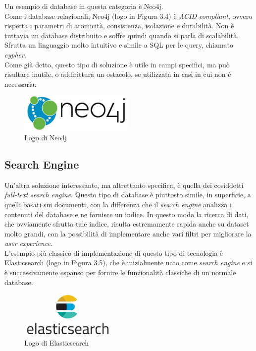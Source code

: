\noindent Un esempio di database in questa categoria è Neo4j\cite{site:udemyneo4j}.\\
Come i database relazionali, Neo4j (logo in Figura 3.4) è \textit{ACID compliant}, ovvero rispetta i parametri di atomicità, consistenza, isolazione e durabilità. Non è tuttavia un \gls{database distribuito} e soffre quindi quando si parla di scalabilità.\\
Sfrutta un linguaggio molto intuitivo e simile a \gls{SQL} per le query, chiamato \textit{cypher}.\\

\noindent Come già detto, questo tipo di soluzione è utile in campi specifici, ma può risultare inutile, o addirittura un ostacolo, se utilizzata in casi in cui non è necessaria.

\begin{figure}[htbp]
\begin{center}
\includegraphics[height=5em]{immagini/tecnologies-logos/neo4j-logo.png}
\caption{Logo di Neo4j}
\end{center}
\end{figure}

\subsection{Search Engine}
Un'altra soluzione interessante, ma altrettanto specifica, è quella dei cosiddetti \textit{full-text search engine}. Questo tipo di database è piuttosto simile, in superficie, a quelli basati sui documenti, con la differenza che il \textit{search engine} analizza i contenuti del database e ne fornisce un indice. In questo modo la ricerca di dati, che ovviamente sfrutta tale indice, risulta estremamente rapida anche su dataset molto grandi, con la possibilità di implementare anche vari filtri per migliorare la \textit{user experience}.\\

\noindent L'esempio più classico di implementazione di questo tipo di tecnologia è Elasticsearch (logo in Figura 3.5), che è inizialmente nato come \textit{search engine} e si è successivamente espanso per fornire le funzionalità classiche di un normale database\cite{site:udemyelasticsearch}.

\begin{figure}[htbp]
\begin{center}
\includegraphics[height=6em]{immagini/tecnologies-logos/Elasticsearch-Logo.png}
\caption{Logo di Elasticsearch}
\end{center}
\end{figure}

